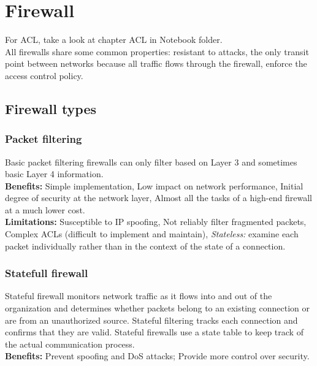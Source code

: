 \chapter{Firewall}

For ACL, take a look at chapter ACL in Notebook folder.\\

All firewalls share some common properties: resistant to attacks, the only transit point between networks because all traffic flows through the firewall, enforce the access control policy. 

\section{Firewall types}

\subsection{Packet filtering}

Basic packet filtering firewalls can only filter based on Layer 3 and sometimes basic Layer 4 information. \\

\textbf{Benefits:} Simple implementation, Low impact on network performance, Initial degree of security at the network layer, Almost all the tasks of a high-end firewall at a much lower cost.\\

\textbf{Limitations:} Susceptible to IP spoofing, Not reliably filter fragmented packets, Complex ACLs (difficult to implement and maintain), \emph{Stateless:} examine each packet individually rather than in the context of the state of a connection.

\subsection{Statefull firewall}

Stateful firewall monitors network traffic as it flows into and out of the organization and determines whether packets belong to an existing connection or are from an unauthorized source. Stateful filtering tracks each connection and confirms that they are valid. Stateful firewalls use a state table to keep track of the actual communication process.\\ 

\textbf{Benefits:} Prevent spoofing and DoS attacks; Provide more control over security.\\ 

